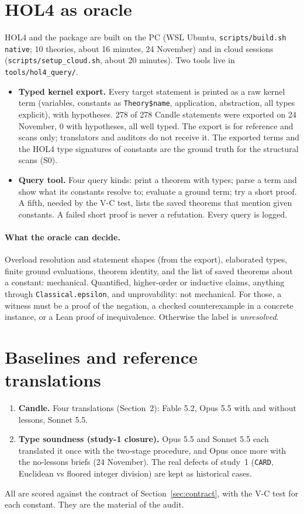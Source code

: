 \documentclass[11pt,a4paper]{article}
\newcommand{\code}[1]{\texttt{#1}}
\begin{document}
\section{HOL4 as oracle}\label{sec:hol4}
HOL4 and the package are built on the PC (WSL Ubuntu, \code{scripts/build.sh native}; 10 theories, about 16 minutes, 24 November) and in cloud sessions (\code{scripts/setup\_cloud.sh}, about 20 minutes). Two tools live in \code{tools/hol4\_query/}.
\begin{itemize}
\item \textbf{Typed kernel export.} Every target statement is printed as a raw kernel term (variables, constants as \code{Theory\$name}, application, abstraction, all types explicit), with hypotheses. 278 of 278 Candle statements were exported on 24 November, 0 with hypotheses, all well typed. The export is for reference and scans only; translators and auditors do not receive it. The exported terms and the HOL4 type signatures of constants are the ground truth for the structural scans (S0).
\item \textbf{Query tool.} Four query kinds: print a theorem with types; parse a term and show what its constants resolve to; evaluate a ground term; try a short proof. A fifth, needed by the V-C test, lists the saved theorems that mention given constants. A failed short proof is never a refutation. Every query is logged.
\end{itemize}
\paragraph{What the oracle can decide.} Overload resolution and statement shapes (from the export), elaborated types, finite ground evaluations, theorem identity, and the list of saved theorems about a constant: mechanical. Quantified, higher-order or inductive claims, anything through \code{Classical.epsilon}, and unprovability: not mechanical. For those, a witness must be a proof of the negation, a checked counterexample in a concrete instance, or a Lean proof of inequivalence. Otherwise the label is \emph{unresolved}.

\section{Baselines and reference translations}\label{sec:ablation}
\begin{enumerate}
\item \textbf{Candle.} Four translations (Section~2): Fable 5.2, Opus 5.5 with and without lessons, Sonnet 5.5.
\item \textbf{Type soundness (study-1 closure).} Opus 5.5 and Sonnet 5.5 each translated it once with the two-stage procedure, and Opus once more with the no-lessons briefs (24 November). The real defects of study~1 (\code{CARD}, Euclidean vs floored integer division) are kept as historical cases.
\end{enumerate}
All are scored against the contract of Section~\ref{sec:contract}, with the V-C test for each constant. They are the material of the audit.
\end{document}
